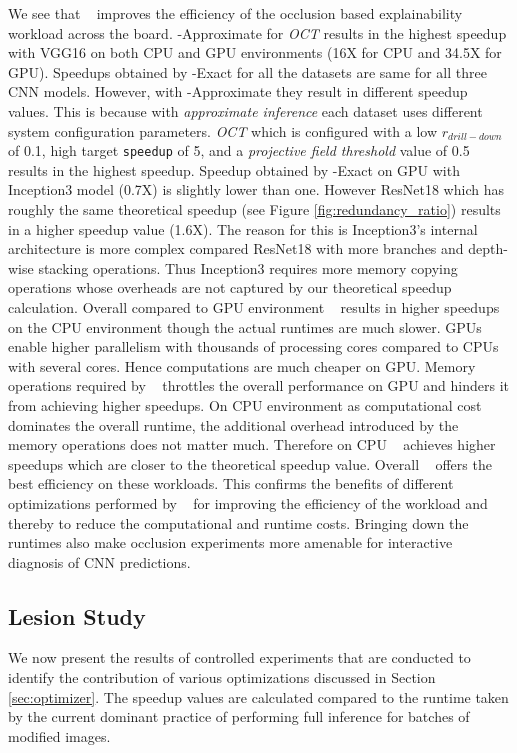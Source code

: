 We see that \system~ improves the efficiency of the occlusion based explainability workload across the board.
\system-Approximate for \textit{OCT} results in the highest speedup with VGG16 on both CPU and GPU environments (16X for CPU and 34.5X for GPU).
Speedups obtained by \system-Exact for all the datasets are same for all three CNN models.
However, with \system-Approximate they result in different speedup values.
This is because with \textit{approximate inference} each dataset uses different system configuration parameters.
\textit{OCT} which is configured with a low $r_{drill-down}$ of 0.1, high target \texttt{speedup} of 5, and a \textit{projective field threshold} value of 0.5 results in the highest speedup.
Speedup obtained by \system-Exact on GPU with Inception3 model (0.7X) is slightly lower than one.
However ResNet18 which has roughly the same theoretical speedup (see Figure \ref{fig:redundancy_ratio}) results in a higher speedup value (1.6X).
The reason for this is Inception3's internal architecture is more complex compared ResNet18 with more branches and depth-wise stacking operations.
Thus Inception3 requires more memory copying operations whose overheads are not captured by our theoretical speedup calculation.
Overall compared to GPU environment \system~ results in higher speedups on the CPU environment though the actual runtimes are much slower.
GPUs enable higher parallelism with thousands of processing cores compared to CPUs with several cores.
Hence computations are much cheaper on GPU.
Memory operations required by \system~ throttles the overall performance on GPU and hinders it from achieving higher speedups.
On CPU environment as computational cost dominates the overall runtime, the additional overhead introduced by the memory operations does not matter much.
Therefore on CPU \system~ achieves higher speedups which are closer to the theoretical speedup value.
Overall \system~ offers the best efficiency on these workloads.
This confirms the benefits of different optimizations performed by \system~ for improving the efficiency of the workload and thereby to reduce the computational and runtime costs.
Bringing down the runtimes also make occlusion experiments more amenable for interactive diagnosis of CNN predictions.


\subsection{Lesion Study}
We now present the results of controlled experiments that are conducted to identify the contribution of various optimizations discussed in Section \ref{sec:optimizer}.
The speedup values are calculated compared to the runtime taken by the current dominant practice of performing full inference for batches of modified images.

